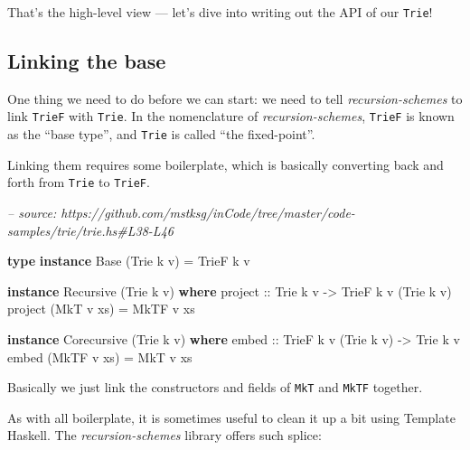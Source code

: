 \documentclass[]{article}
\newenvironment{Shaded}{}{}
\newcommand{\CommentTok}[1]{\textcolor[rgb]{0.38,0.63,0.69}{\textit{#1}}}
\newcommand{\DataTypeTok}[1]{\textcolor[rgb]{0.56,0.13,0.00}{#1}}
\newcommand{\FunctionTok}[1]{\textcolor[rgb]{0.02,0.16,0.49}{#1}}
\newcommand{\KeywordTok}[1]{\textcolor[rgb]{0.00,0.44,0.13}{\textbf{#1}}}
\newcommand{\NormalTok}[1]{#1}
\newcommand{\OtherTok}[1]{\textcolor[rgb]{0.00,0.44,0.13}{#1}}
\begin{document}
That's the high-level view --- let's dive into writing out the API of our
\texttt{Trie}!

\hypertarget{linking-the-base}{%
\subsection{Linking the base}\label{linking-the-base}}

One thing we need to do before we can start: we need to tell
\emph{recursion-schemes} to link \texttt{TrieF} with \texttt{Trie}. In the
nomenclature of \emph{recursion-schemes}, \texttt{TrieF} is known as the ``base
type'', and \texttt{Trie} is called ``the fixed-point''.

Linking them requires some boilerplate, which is basically converting back and
forth from \texttt{Trie} to \texttt{TrieF}.

\begin{Shaded}
\begin{Highlighting}[]
\CommentTok{-- source: https://github.com/mstksg/inCode/tree/master/code-samples/trie/trie.hs#L38-L46}

\KeywordTok{type} \KeywordTok{instance} \DataTypeTok{Base}\NormalTok{ (}\DataTypeTok{Trie}\NormalTok{ k v) }\FunctionTok{=} \DataTypeTok{TrieF}\NormalTok{ k v}

\KeywordTok{instance} \DataTypeTok{Recursive}\NormalTok{ (}\DataTypeTok{Trie}\NormalTok{ k v) }\KeywordTok{where}
\OtherTok{    project ::} \DataTypeTok{Trie}\NormalTok{ k v }\OtherTok{->} \DataTypeTok{TrieF}\NormalTok{ k v (}\DataTypeTok{Trie}\NormalTok{ k v)}
\NormalTok{    project (}\DataTypeTok{MkT}\NormalTok{ v xs) }\FunctionTok{=} \DataTypeTok{MkTF}\NormalTok{ v xs}

\KeywordTok{instance} \DataTypeTok{Corecursive}\NormalTok{ (}\DataTypeTok{Trie}\NormalTok{ k v) }\KeywordTok{where}
\OtherTok{    embed ::} \DataTypeTok{TrieF}\NormalTok{ k v (}\DataTypeTok{Trie}\NormalTok{ k v) }\OtherTok{->} \DataTypeTok{Trie}\NormalTok{ k v}
\NormalTok{    embed (}\DataTypeTok{MkTF}\NormalTok{ v xs) }\FunctionTok{=} \DataTypeTok{MkT}\NormalTok{ v xs}
\end{Highlighting}
\end{Shaded}

Basically we just link the constructors and fields of \texttt{MkT} and
\texttt{MkTF} together.

As with all boilerplate, it is sometimes useful to clean it up a bit using
Template Haskell. The \emph{recursion-schemes} library offers such splice:
\end{document}
